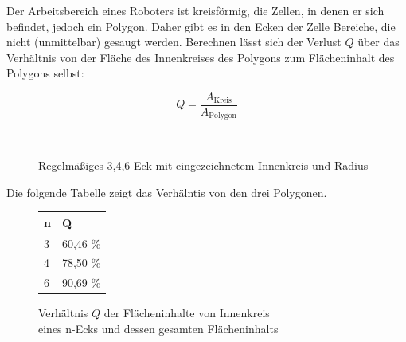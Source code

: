 \documentclass{article}
\begin{document}
Der Arbeitsbereich eines Roboters ist kreisförmig, die Zellen, in denen er
sich befindet, jedoch ein Polygon. Daher gibt es in den Ecken der Zelle 
Bereiche, die nicht (unmittelbar) gesaugt werden. Berechnen lässt 
sich der Verlust $Q$ über das Verhältnis von der Fläche des Innenkreises 
des Polygons zum Flächeninhalt des Polygons selbst:

\begin{equation*}
  Q = \frac{A_\text{Kreis} }{A_\text{Polygon}}
\end{equation*}

\begin{figure}[!ht]
  \centering
  \qquad
  \qquad
  \\
  \caption{Regelmäßiges 3,4,6-Eck mit eingezeichnetem Innenkreis und Radius}
  \label{fig:floor_quotient_circle_polygon}
\end{figure}

Die folgende Tabelle zeigt das Verhälntis von den drei Polygonen. 


\begin{figure}[ht]
\begin{center}
    \begin{tabular}{ l | l}
    n & Q \\ \hline
    3 & 60,46 \% \\
    4 & 78,50 \% \\
    6 & 90,69 \% \\
    \end{tabular}
    \caption{Verhältnis $Q$ der Flächeninhalte von Innenkreis \\ eines n-Ecks und dessen gesamten Flächeninhalts}
    \end{center}
\end{figure}
\end{document}
